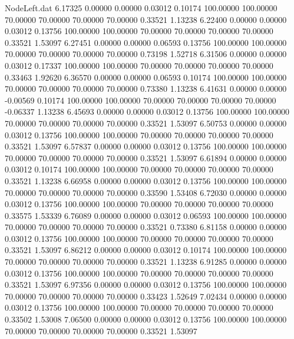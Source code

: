 \begin{filecontents}{NodeLeft.dat}
   6.17325    0.00000    0.00000     0.03012    0.10174  100.00000  100.00000   70.00000   70.00000   70.00000   70.00000    0.33521    1.13238
   6.22400    0.00000    0.00000     0.03012    0.13756  100.00000  100.00000   70.00000   70.00000   70.00000   70.00000    0.33521    1.53097
   6.27451    0.00000    0.00000     0.06593    0.13756  100.00000  100.00000   70.00000   70.00000   70.00000   70.00000    0.73198    1.52718
   6.31506    0.00000    0.00000     0.03012    0.17337  100.00000  100.00000   70.00000   70.00000   70.00000   70.00000    0.33463    1.92620
   6.36570    0.00000    0.00000     0.06593    0.10174  100.00000  100.00000   70.00000   70.00000   70.00000   70.00000    0.73380    1.13238
   6.41631    0.00000    0.00000    -0.00569    0.10174  100.00000  100.00000   70.00000   70.00000   70.00000   70.00000   -0.06337    1.13238
   6.45693    0.00000    0.00000     0.03012    0.13756  100.00000  100.00000   70.00000   70.00000   70.00000   70.00000    0.33521    1.53097
   6.50753    0.00000    0.00000     0.03012    0.13756  100.00000  100.00000   70.00000   70.00000   70.00000   70.00000    0.33521    1.53097
   6.57837    0.00000    0.00000     0.03012    0.13756  100.00000  100.00000   70.00000   70.00000   70.00000   70.00000    0.33521    1.53097
   6.61894    0.00000    0.00000     0.03012    0.10174  100.00000  100.00000   70.00000   70.00000   70.00000   70.00000    0.33521    1.13238
   6.66958    0.00000    0.00000     0.03012    0.13756  100.00000  100.00000   70.00000   70.00000   70.00000   70.00000    0.33590    1.53408
   6.72030    0.00000    0.00000     0.03012    0.13756  100.00000  100.00000   70.00000   70.00000   70.00000   70.00000    0.33575    1.53339
   6.76089    0.00000    0.00000     0.03012    0.06593  100.00000  100.00000   70.00000   70.00000   70.00000   70.00000    0.33521    0.73380
   6.81158    0.00000    0.00000     0.03012    0.13756  100.00000  100.00000   70.00000   70.00000   70.00000   70.00000    0.33521    1.53097
   6.86212    0.00000    0.00000     0.03012    0.10174  100.00000  100.00000   70.00000   70.00000   70.00000   70.00000    0.33521    1.13238
   6.91285    0.00000    0.00000     0.03012    0.13756  100.00000  100.00000   70.00000   70.00000   70.00000   70.00000    0.33521    1.53097
   6.97356    0.00000    0.00000     0.03012    0.13756  100.00000  100.00000   70.00000   70.00000   70.00000   70.00000    0.33423    1.52649
   7.02434    0.00000    0.00000     0.03012    0.13756  100.00000  100.00000   70.00000   70.00000   70.00000   70.00000    0.33502    1.53008
   7.06500    0.00000    0.00000     0.03012    0.13756  100.00000  100.00000   70.00000   70.00000   70.00000   70.00000    0.33521    1.53097

\end{filecontents}
